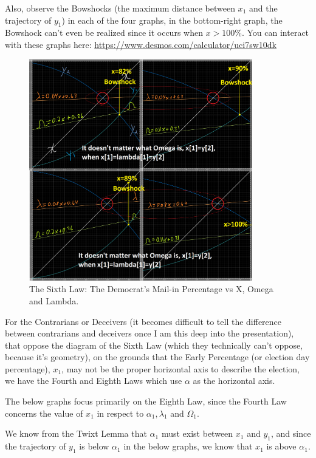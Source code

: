\documentclass[preprint,13pt]{elsarticle}
\begin{document}
Also, observe the Bowshocks (the maximum distance between $x_{1}$ and the trajectory of $y_{1}$) in each of the four graphs, in the bottom-right graph, the Bowshock can't even be realized since it occurs when $x>100\%$. You can interact with these graphs here: \url{https://www.desmos.com/calculator/uci7sw10dk}
\begin{figure}[bp!]
\begin{center}
\caption{The Sixth Law: The Democrat's Mail-in Percentage vs X, Omega and Lambda.}
\includegraphics[width=275pt]{Sixth Law, x,lambda,omega.png}
\end{center}
\end{figure}
\newpage
For the Contrarians or Deceivers (it becomes difficult to tell the difference between contrarians and deceivers once I am this deep into the presentation), that oppose the diagram of the Sixth Law (which they technically can't oppose, because it's geometry), on the grounds that the Early Percentage (or election day percentage), $x_{1}$, may not be the proper horizontal axis to describe the election, we have the Fourth and Eighth Laws which use $\alpha$ as the horizontal axis.

The below graphs focus primarily on the Eighth Law, since the Fourth Law concerns the value of $x_{1}$ in respect to $\alpha_{1}, \lambda_{1}$ and $\Omega_{1}$. 

We know from the Twixt Lemma that $\alpha_{1}$ must exist between $x_{1}$ and $y_{1}$, and since the trajectory of $y_{1}$ is below $\alpha_{1}$ in the below graphs, we know that $x_{1}$ is above $\alpha_{1}$.
\end{document}
